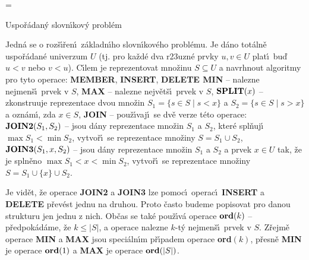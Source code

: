 



\magnification=
\NoPageNumbers
\nopagenumbers
\pagewidth{5.4in}


\def \emph#1{\underbar{#1}}
\def \Prob{\operatorname{Prob}}
\def \count{\operatorname{count}}
\def \NIL{\operatorname{NIL}}
\def \otec{\operatorname{otec}}
\def \list{\operatorname{list}}
\def \Prv{\operatorname{Prv}}
\def \Nasl{\operatorname{Nasl}}
\def \levy{\operatorname{levy}}
\def \pravy{\operatorname{pravy}}
\def \bratr{\operatorname{bratr}}
\def \Prst{\operatorname{Prst}}
\def \key{\operatorname{key}}
\def \hloubka{\operatorname{hloubka}}


\heading
Uspo\v r\'adan\'y slovn\'\i kov\'y probl\'em
\endheading

\flushpar Jedn\'a se o roz\v s\'\i\v ren\'\i\ z\'akladn\'\i ho slovn\'\i kov\'eho probl\'emu. Je 
d\'ano tot\'aln\v e uspo\v r\'adan\'e univerzum $U$ (tj. pro ka\v zd\'e dva 
r\accent23uzn\'e prvky $u,v\in U$ plat\'\i\ bu\v d $u<v$ nebo $v<
u$). C\'\i lem 
je reprezentovat 
mno\v zinu $S\subseteq U$ a navrhnout algoritmy pro tyto operace:\newline 
{\bf MEMBER}, {\bf INSERT}, {\bf DELETE\newline 
MIN} -- nalezne nejmen\v s\'\i\ prvek v $S$,\newline 
{\bf MAX} -- nalezne nejv\v et\v s\'\i\ prvek v $S$,\newline 
$\bold S\bold P\bold L\bold I\bold T(x)$ -- zkonstruuje reprezentace dvou mno\v zin 
$S_1=\{s\in S\mid s<x\}$ a $S_2=\{s\in S\mid s>x\}$ a ozn\'am\'\i , zda 
$x\in S$,\newline 
{\bf JOIN} -- pou\v z\'\i vaj\'\i\ se dv\v e verze t\'eto operace:\newline 
$\bold J\bold O\bold I\bold N\bold 2(S_1,S_2)$ -- jsou d\'any reprezentace mno\v zin $
S_1$ a $S_2$, kter\'e 
spl\v nuj\'\i\ $\max S_1<\min S_2$, vytvo\v r\'\i\ se reprezentace mno\v ziny 
$S=S_1\cup S_2$,\newline 
$\bold J\bold O\bold I\bold N\bold 3(S_1,x,S_2)$ -- jsou d\'any reprezentace mno\v zin $
S_1$ a $S_2$ a 
prvek $x\in U$ tak, \v ze je spln\v eno $\max S_1<x<\min S_2$, vytvo\v r\'\i\ 
se reprezentace mno\v ziny $S=S_1\cup \{x\}\cup S_2$.
\smallskip

\flushpar Je vid\v et, \v ze operace {\bf JOIN2} a {\bf JOIN3} lze pomoc\'\i\ ope\-rac\'\i\ 
{\bf INSERT} a {\bf DELETE} p\v rev\'est jednu na druhou. Proto \v casto budeme 
popisovat pro danou strukturu jen jednu z nich. 
Ob\v cas se tak\'e pou\v z\'\i v\'a operace\newline 
$\bold o\bold r\bold d(k)$ -- p\v redpok\'ad\'ame, \v ze $k\le |S
|$, a operace nalezne $k$-t\'y 
nejmen\v s\'\i\ prvek v $S$.\newline 
Z\v rejm\v e operace {\bf MIN} a {\bf MAX} jsou speci\'aln\'\i m p\v r\'\i padem 
ope\-race {\bf ord$(k)$}, 
p\v resn\v e {\bf MIN} je operace $\bold o\bold r\bold d(1)$ a {\bf MAX} je operace $
\bold o\bold r\bold d(|S|)$.


